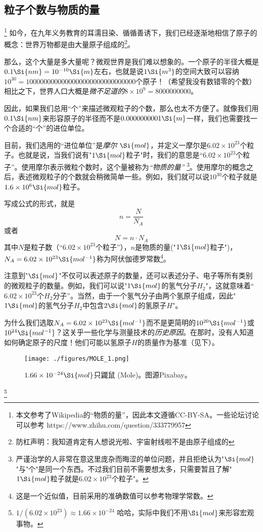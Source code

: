 
\subsection{粒子个数与物质的量}
\footnote{本文参考了Wikipedia的“物质的量”，因此本文遵循CC-BY-SA。一些论坛讨论可以参考 https://www.zhihu.com/question/333779957}
如今，在九年义务教育的耳濡目染、循循善诱下，我们已经逐渐地相信了原子的概念：世界万物都是由大量原子组成的\footnote{防杠声明：我知道肯定有人想说光啦、宇宙射线啦不是由原子组成的}。

那么，这个大量是多大量呢？微观世界是我们难以想象的。一个原子的半径大概是$0.1 \Si{nm} = 10^{-10} \Si{m}$左右，也就是说$1 \Si{m^3}$的空间大致可以容纳$10^{30}=1000000000000000000000000000000$个原子！（希望我没有数错零的个数）相比之下，世界人口大概是\textsl{微不足道的}$8\times 10^9=8000000000$。

因此，如果我们总用“个”来描述微观粒子的个数，那么也太不方便了。就像我们用$0.1 \Si{nm}$来形容原子的半径而不是$0.0000000001 \Si{m}$一样，我们也需要找一个合适的“个”的进位单位。

目前，我们选用的“进位单位”是\textsl{摩尔 $\Si{mol}$}，并定义一摩尔是$6.02\times 10^{23}$个粒子。也就是说，当我们说有"$1 \Si{mol}$粒子"时，我们的意思是“$6.02\times 10^{23}$个粒子”。使用摩尔表示微粒个数时，这个量被称为\textsl{“物质的量”} \footnote{严谨治学的人非常在意这里庞杂而晦涩的单位问题，并且拒绝认为"$\Si{mol}$"与"个"是同一个东西。不过我们目前不需要想太多，只需要暂且了解"$1 \Si{mol}$粒子就是$6.02\times 10^{23}$个粒子"。}。使用摩尔的概念之后，表述微观粒子的个数就会稍微简单一些。例如，我们就可以说$10^{30}$个粒子就是$1.6\times 10^6 \Si{mol}$粒子。

写成公式的形式，就是
$$n=\frac{N}{N_A}$$
或者
$$N=n \cdot N_A$$
其中$N$是粒子数（“$6.02\times 10^{23}$个粒子”），$n$是物质的量("$1 \Si{mol}$粒子")，$N_A = 6.02\times 10^{23} \Si{mol^{-1}}$称为阿伏伽德罗常数\footnote{这是一个近似值，目前采用的准确数值可以参考物理学常数。}。

注意到"$\Si{mol}$"不仅可以表述原子的数量，还可以表述分子、电子等所有类别的微观粒子的数量。例如，我们可以说"$1\Si{mol}$的氢气分子$H_2$"，这就意味着“$6.02\times 10^{23}$个$H_2$分子”。当然，由于一个氢气分子由两个氢原子组成，因此"$1\Si{mol}$的氢气分子$H_2$中包含$2\Si{mol}$的氢原子$H$"。

为什么我们选取$N_A = 6.02\times 10^{23} \Si{mol^{-1}}$而不是更简明的$10^{20} \Si{mol^{-1}}$或$10^{24} \Si{mol^{-1}}$？这关乎一些化学与测量技术的\textsl{历史原因}。在那时，没有人知道如何确定原子的尺度！他们可能以氢原子$H$的质量作为基准（见下）。
\begin{figure}[ht]
\centering
\texttt{[image: ./figures/MOLE\_1.png]}
\caption{$1.66\times10^{-24} \Si{mol}$只鼹鼠 (Mole)。图源Pixabay。} \label{MOLE_fig1}
\end{figure}\footnote{$1/(6.02\times10^{23}) \approx 1.66\times10^{-24}$ 哈哈，实际中我们不用$\Si{mol}$来形容宏观事物。}

